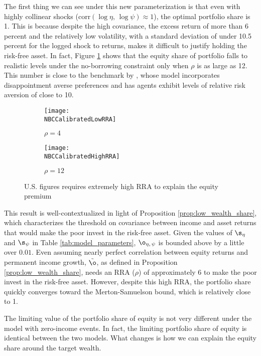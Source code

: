 The first thing we can see under this new parameterization is that even with highly collinear shocks ($\text{corr}(\log\eta,\,\log\psi) \approx 1$), the optimal portfolio share is 1. This is because despite the high covariance, the excess return of more than 6 percent and the relatively low volatility, with a standard deviation of under 10.5 percent for the logged shock to returns, makes it difficult to justify holding the risk-free asset. In fact, Figure \ref{fig:US_rho_comparison} shows that the equity share of portfolio falls to realistic levels under the no-borrowing constraint only when $\rho$ is as large as 12. This number is close to the benchmark by \citet{Schreindorfer2020}, whose model incorporates disappointment averse preferences and has agents exhibit levels of relative risk aversion of close to 10.

\begin{figure}[h]
    \centering
    \begin{subfigure}{0.49\textwidth}
        \centering
        \texttt{[image: \\NBCCalibratedLowRRA]}
        \caption{$\rho = 4$}
    \end{subfigure}
    \begin{subfigure}{0.49\textwidth}
        \centering
        \texttt{[image: \\NBCCalibratedHighRRA]}
        \caption{$\rho = 12$}
    \end{subfigure}
    \caption{U.S. figures requires extremely high RRA to explain the equity premium}
    \label{fig:US_rho_comparison}
\end{figure}

This result is well-contextualized in light of Proposition \ref{prop:low_wealth_share}, which characterizes the threshold on covariance between income and asset returns that would make the poor invest in the risk-free asset. Given the values of $\s_{\eta}$ and $\s_{\psi}$ in Table \ref{tab:model_parameters}, $\o_{\eta,\,\psi}$ is bounded above by a little over $0.01$. Even assuming nearly perfect correlation between equity returns and permanent income growth, $\tilde{\o}$, as defined in Proposition \ref{prop:low_wealth_share}, needs an RRA ($\rho$) of approximately 6 to make the poor invest in the risk-free asset. However, despite this high RRA, the portfolio share quickly converges toward the Merton-Samuelson bound, which is relatively close to 1.

The limiting value of the portfolio share of equity is not very different under the model with zero-income events. In fact, the limiting portfolio share of equity is identical between the two models. What changes is how we can explain the equity share around the target wealth.


